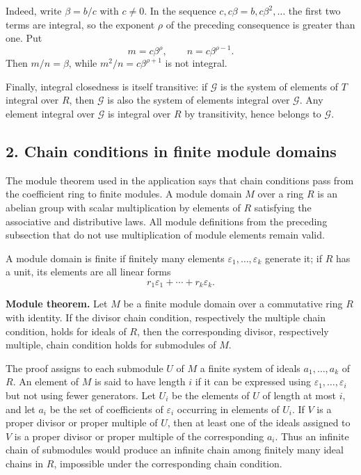 \documentclass[11pt]{article}
\begin{document}
Indeed, write $\beta=b/c$ with $c\neq0$. In the sequence $c,c\beta=b,c\beta^2,\ldots$ the first two terms are integral, so the exponent $\rho$ of the preceding consequence is greater than one. Put
\[
  m=c\beta^\rho,
  \qquad n=c\beta^{\rho-1}.
\]
Then $m/n=\beta$, while $m^2/n=c\beta^{\rho+1}$ is not integral.

Finally, integral closedness is itself transitive: if $\mathcal G$ is the system of elements of $T$ integral over $R$, then $\mathcal G$ is also the system of elements integral over $\mathcal G$. Any element integral over $\mathcal G$ is integral over $R$ by transitivity, hence belongs to $\mathcal G$.

\subsection{2. Chain conditions in finite module domains}

The module theorem used in the application says that chain conditions pass from the coefficient ring to finite modules. A module domain $M$ over a ring $R$ is an abelian group with scalar multiplication by elements of $R$ satisfying the associative and distributive laws. All module definitions from the preceding subsection that do not use multiplication of module elements remain valid.

A module domain is finite if finitely many elements $\varepsilon_1,\ldots,\varepsilon_k$ generate it; if $R$ has a unit, its elements are all linear forms
\[
  r_1\varepsilon_1+\cdots+r_k\varepsilon_k.
\]

\textbf{Module theorem.} Let $M$ be a finite module domain over a commutative ring $R$ with identity. If the divisor chain condition, respectively the multiple chain condition, holds for ideals of $R$, then the corresponding divisor, respectively multiple, chain condition holds for submodules of $M$.

The proof assigns to each submodule $U$ of $M$ a finite system of ideals $a_1,\ldots,a_k$ of $R$. An element of $M$ is said to have length $i$ if it can be expressed using $\varepsilon_1,
\ldots,\varepsilon_i$ but not using fewer generators. Let $U_i$ be the elements of $U$ of length at most $i$, and let $a_i$ be the set of coefficients of $\varepsilon_i$ occurring in elements of $U_i$. If $V$ is a proper divisor or proper multiple of $U$, then at least one of the ideals assigned to $V$ is a proper divisor or proper multiple of the corresponding $a_i$. Thus an infinite chain of submodules would produce an infinite chain among finitely many ideal chains in $R$, impossible under the corresponding chain condition.
\end{document}
